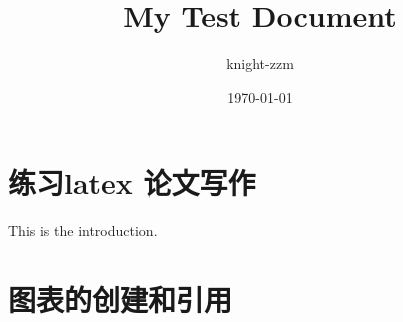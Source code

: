 \documentclass[a4paper,12pt]{article}
\begin{document}
\title{My Test Document}
\author{knight-zzm}
\date{\today}
\maketitle
\newpage
\section{练习latex 论文写作}
This is the introduction.

\section{图表的创建和引用}
\end{document}
